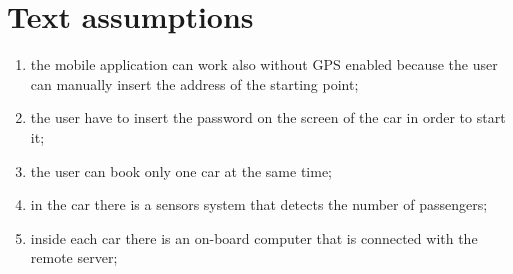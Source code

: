 \section{Text assumptions}
\begin{enumerate}
	\item the mobile application can work also without GPS enabled because the user can manually insert the address of the starting point;
	\item the user have to insert the password on the screen of the car in order to start it;
	\item the user can book only one car at the same time;
	\item in the car there is a sensors system that detects the number of passengers;
	\item inside each car there is an on-board computer that is connected with the remote server;
\end{enumerate}
